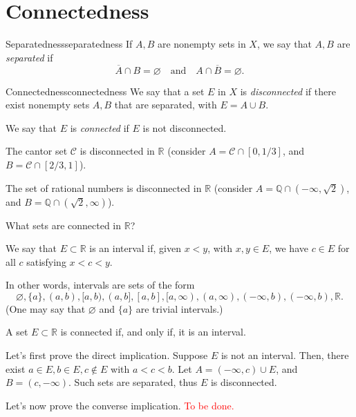 
\section{Connectedness}

\begin{defn}{Separatedness}{separatedness}
	If \(A, B\) are nonempty sets in \(X\), we say that \(A, B\) are \emph{separated} if \[
		\overline A \cap B = \varnothing \quad \text{and} \quad A \cap \overline B = \varnothing.
	\]
\end{defn}

\begin{defn}{Connectedness}{connectedness}
	We say that a set \(E\) in \(X\) is \emph{disconnected} if there exist nonempty sets \(A, B\) that are separated, with \(E = A \cup B\).

	We say that \(E\) is \emph{connected} if \(E\) is not disconnected.
\end{defn}

\begin{exmp}{}{}
	The cantor set \(\mathcal C\) is disconnected in \(\mathbb{R}\) (consider \(A = \mathcal C \cap [0, 1/3]\), and \(B = \mathcal C \cap [2/3, 1]\)).

	The set of rational numbers is disconnected in \(\mathbb{R}\) (consider \(A = \mathbb{Q} \cap (-\infty, \sqrt{2})\), and \(B = \mathbb{Q} \cap (\sqrt{2}, \infty)\)).
\end{exmp}

\begin{que}{}{}
	What sets are connected in \(\mathbb{R}\)?
\end{que}

\begin{defn}{}{}
	We say that \(E \subset \mathbb{R}\) is an interval if, given \(x < y\), with \(x, y \in E\), we have \(c \in E\) for all \(c\) satisfying \(x < c < y\).
\end{defn}

In other words, intervals are sets of the form \[
	\varnothing, \{a\}, (a, b), [a, b), (a, b], [a, b], [a, \infty), (a, \infty), (-\infty, b), (-\infty, b), \mathbb{R}.
\]
(One may say that \(\varnothing\) and \(\{a\}\) are trivial intervals.)

\begin{thm}{}{}
	A set \(E \subset \mathbb{R}\) is connected if, and only if, it is an interval.
\end{thm}

\begin{dem}{}{}
	Let's first prove the direct implication.
	Suppose \(E\) is not an interval. Then, there exist \(a \in E, b \in E, c \notin E\) with \(a < c < b\). Let \(A = (-\infty, c) \cup E\), and \(B = (c, -\infty)\). Such sets are separated, thus \(E\) is disconnected.

	Let's now prove the converse implication.
	\textcolor{red}{To be done.}
\end{dem}

